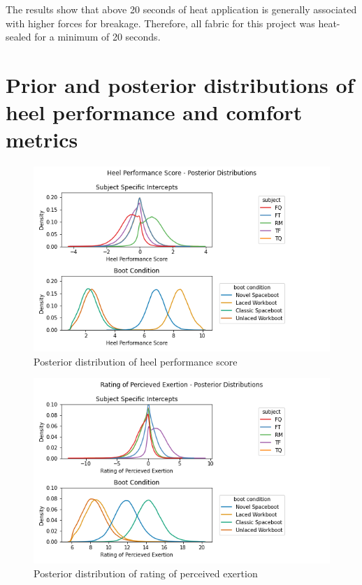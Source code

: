 \documentclass[defaultstyle,11pt]{thesis}
\begin{document}
The results show that above 20 seconds of heat application is generally associated with higher forces for breakage.
Therefore, all fabric for this project was heat-sealed for a minimum of 20 seconds.

\hypertarget{sec:AB}{%
\chapter{Prior and posterior distributions of heel performance and comfort metrics}\label{sec:AB}}

\begin{figure}
\centering
\includegraphics{../fig/Appendix/Heel Performance Score_posterior.png}
\caption{Posterior distribution of heel performance score}
\end{figure}

\begin{figure}
\centering
\includegraphics{../fig/Appendix/Rating of Percieved Exertion_posterior.png}
\caption{Posterior distribution of rating of perceived exertion}
\end{figure}
\end{document}
